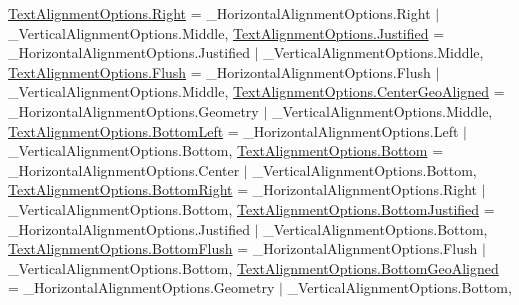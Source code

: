 \begin{DoxyCompactItemize}
\newline
\mbox{\hyperlink{namespace_t_m_pro_a1dd743b58b1fd4057c00e4b98ab86301a92b09c7c48c520c3c55e497875da437c}{Text\+Alignment\+Options.\+Right}} = \+\_\+\+Horizontal\+Alignment\+Options.\+Right $\vert$ \+\_\+\+Vertical\+Alignment\+Options.\+Middle, 
\mbox{\hyperlink{namespace_t_m_pro_a1dd743b58b1fd4057c00e4b98ab86301a058cc077563d4b47b43ae642a6478159}{Text\+Alignment\+Options.\+Justified}} = \+\_\+\+Horizontal\+Alignment\+Options.\+Justified $\vert$ \+\_\+\+Vertical\+Alignment\+Options.\+Middle, 
\mbox{\hyperlink{namespace_t_m_pro_a1dd743b58b1fd4057c00e4b98ab86301a75f33789f924a80667bcdf8e195c1a1d}{Text\+Alignment\+Options.\+Flush}} = \+\_\+\+Horizontal\+Alignment\+Options.\+Flush $\vert$ \+\_\+\+Vertical\+Alignment\+Options.\+Middle, 
\mbox{\hyperlink{namespace_t_m_pro_a1dd743b58b1fd4057c00e4b98ab86301a247f8067dc23bde97b6e356083fa3ce9}{Text\+Alignment\+Options.\+Center\+Geo\+Aligned}} = \+\_\+\+Horizontal\+Alignment\+Options.\+Geometry $\vert$ \+\_\+\+Vertical\+Alignment\+Options.\+Middle, 
\newline
\mbox{\hyperlink{namespace_t_m_pro_a1dd743b58b1fd4057c00e4b98ab86301a98e5a1c44509157ebcaf46c515c78875}{Text\+Alignment\+Options.\+Bottom\+Left}} = \+\_\+\+Horizontal\+Alignment\+Options.\+Left $\vert$ \+\_\+\+Vertical\+Alignment\+Options.\+Bottom, 
\mbox{\hyperlink{namespace_t_m_pro_a1dd743b58b1fd4057c00e4b98ab86301a2ad9d63b69c4a10a5cc9cad923133bc4}{Text\+Alignment\+Options.\+Bottom}} = \+\_\+\+Horizontal\+Alignment\+Options.\+Center $\vert$ \+\_\+\+Vertical\+Alignment\+Options.\+Bottom, 
\mbox{\hyperlink{namespace_t_m_pro_a1dd743b58b1fd4057c00e4b98ab86301a9146bfc669fddc88db2c4d89297d0e9a}{Text\+Alignment\+Options.\+Bottom\+Right}} = \+\_\+\+Horizontal\+Alignment\+Options.\+Right $\vert$ \+\_\+\+Vertical\+Alignment\+Options.\+Bottom, 
\mbox{\hyperlink{namespace_t_m_pro_a1dd743b58b1fd4057c00e4b98ab86301a461fee574e8978ce4a1b748fd23f1b30}{Text\+Alignment\+Options.\+Bottom\+Justified}} = \+\_\+\+Horizontal\+Alignment\+Options.\+Justified $\vert$ \+\_\+\+Vertical\+Alignment\+Options.\+Bottom, 
\newline
\mbox{\hyperlink{namespace_t_m_pro_a1dd743b58b1fd4057c00e4b98ab86301af09af8abe6c911b5499e6affbbaf6e4a}{Text\+Alignment\+Options.\+Bottom\+Flush}} = \+\_\+\+Horizontal\+Alignment\+Options.\+Flush $\vert$ \+\_\+\+Vertical\+Alignment\+Options.\+Bottom, 
\mbox{\hyperlink{namespace_t_m_pro_a1dd743b58b1fd4057c00e4b98ab86301a569148d9dc0511a1bad8e278c35c01a1}{Text\+Alignment\+Options.\+Bottom\+Geo\+Aligned}} = \+\_\+\+Horizontal\+Alignment\+Options.\+Geometry $\vert$ \+\_\+\+Vertical\+Alignment\+Options.\+Bottom, 

\end{DoxyCompactItemize}
